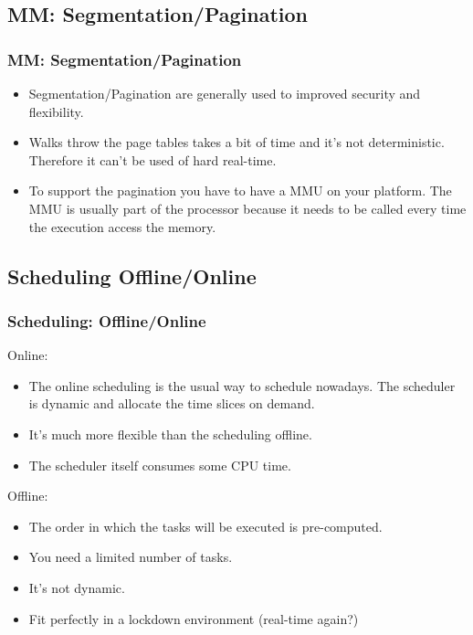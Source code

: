 \subsection{MM: Segmentation/Pagination}
\begin{frame}
  \frametitle{MM: Segmentation/Pagination}
  \begin{itemize}
        \item Segmentation/Pagination are generally used to improved
        security and flexibility.
        \item Walks throw the page tables takes a bit of time and
        it's not deterministic. Therefore it can't be used of hard
        real-time.
        \item To support the pagination you have to have a MMU on your
        platform. The MMU is usually part of the processor because it
        needs to be called every time the execution access the memory.
  \end{itemize}
\end{frame}

\subsection{Scheduling Offline/Online}
\begin{frame}
  \frametitle{Scheduling: Offline/Online}
        Online:
        \begin{itemize}
                \item The online scheduling is the usual way to schedule nowadays. The scheduler is dynamic and allocate the time slices on demand.
                \item It's much more flexible than the scheduling offline.
                \item The scheduler itself consumes some CPU time.
        \end{itemize}
        \-
        Offline:
        \begin{itemize}
                \item The order in which the tasks will be executed is pre-computed.
                \item You need a limited number of tasks.
                \item It's not dynamic.
                \item Fit perfectly in a lockdown environment (real-time again?)
        \end{itemize}
\end{frame}

